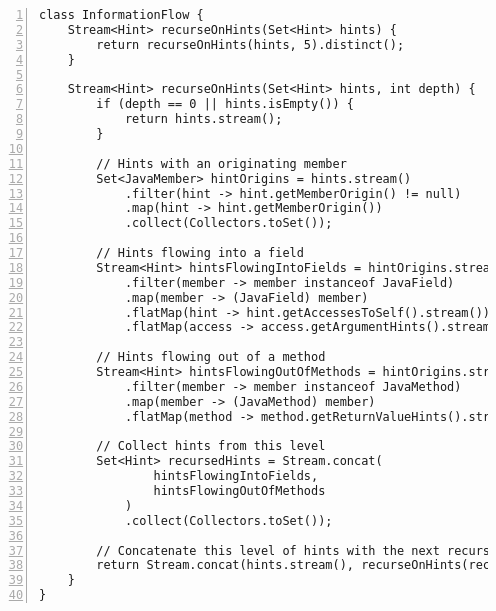 \clearpage
\begin{lstlisting}[caption=Constraint 7: \texttt{InformationFlow} class used for hint recursion., captionpos=b, label=lst:constraint_7_flow, numbers=left, showstringspaces=false]
class InformationFlow {
    Stream<Hint> recurseOnHints(Set<Hint> hints) {
        return recurseOnHints(hints, 5).distinct();
    }

    Stream<Hint> recurseOnHints(Set<Hint> hints, int depth) {
        if (depth == 0 || hints.isEmpty()) {
            return hints.stream();
        }

        // Hints with an originating member
        Set<JavaMember> hintOrigins = hints.stream()
            .filter(hint -> hint.getMemberOrigin() != null)
            .map(hint -> hint.getMemberOrigin())
            .collect(Collectors.toSet());

        // Hints flowing into a field
        Stream<Hint> hintsFlowingIntoFields = hintOrigins.stream()
            .filter(member -> member instanceof JavaField)
            .map(member -> (JavaField) member)
            .flatMap(hint -> hint.getAccessesToSelf().stream())
            .flatMap(access -> access.getArgumentHints().stream());

        // Hints flowing out of a method
        Stream<Hint> hintsFlowingOutOfMethods = hintOrigins.stream()
            .filter(member -> member instanceof JavaMethod)
            .map(member -> (JavaMethod) member)
            .flatMap(method -> method.getReturnValueHints().stream());

        // Collect hints from this level
        Set<Hint> recursedHints = Stream.concat(
                hintsFlowingIntoFields, 
                hintsFlowingOutOfMethods
            )
            .collect(Collectors.toSet());

        // Concatenate this level of hints with the next recursion level
        return Stream.concat(hints.stream(), recurseOnHints(recursedHints, depth - 1));
    }
}
\end{lstlisting}